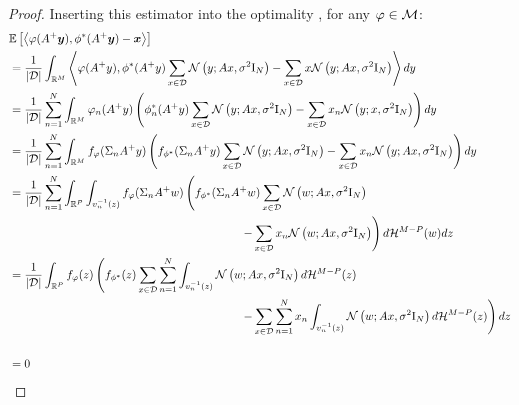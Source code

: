 \documentclass[a4paper,10pt]{article}
\begin{document}
\begin{proof}
Inserting this estimator into the optimality , for any $\varphi \in \mathcal{M}$:
\begin{align*}
    &\E{\inner{\varphi(A^+ \y), \phi^*(A^+  \y) - \x}}  \\
    &=  \frac{1}{|\D|} \int_{\R^M} \inner{\varphi(A^+  y), \phi^*(A^+  y) \sum_{x \in \D} \Normal{y; A x, \sigma^2 \Id_N} - \sum_{x \in \D} x \Normal{y; A x, \sigma^2 \Id_N}} dy \\
    &=  \frac{1}{|\D|} \sum_{n = 1}^{N} \int_{\R^M} \varphi_n (A^+  y) \left( \phi^*_n(A^+  y) \sum_{x \in \D} \Normal{y; A x, \sigma^2 \Id_N} - \sum_{x \in \D} x_n \Normal{y; x, \sigma^2 \Id_N} \right) dy \\
    &=  \frac{1}{|\D|} \sum_{n = 1}^{N} \int_{\R^M} f_{\varphi} (\Sigma_n A^+  y) \left( f_{\phi^*}(\Sigma_n A^+  y) \sum_{x \in \D} \Normal{y; A x, \sigma^2 \Id_N} - \sum_{x \in \D} x_n \Normal{y; A x, \sigma^2 \Id_N} \right) dy \\
    &=  \frac{1}{|\D|} \sum_{n = 1}^{N} \int_{\R^P} \int_{v_n^{-1}(z)} f_{\varphi} (\Sigma_n A^+ w) \left( f_{\phi^*}(\Sigma_n A^+ w) \sum_{x \in \D} \Normal{w; A x, \sigma^2 \Id_N} \right. 
    \\& \left. \hspace{7cm} -\sum_{x \in \D} x_n \Normal{w; A x, \sigma^2 \Id_N} \right) d\H^{M - P}(w) dz \\
    &=  \frac{1}{|\D|}  \int_{\R^P} f_{\varphi}(z) \left(  f_{\phi^*}(z) \sum_{x \in \D} \sum_{n = 1}^{N} \int_{v_n^{-1}(z)} \Normal{w; A x, \sigma^2 \Id_N} d\H^{M-P}(z) \right. 
    \\& \left. \hspace{7cm} - \sum_{x \in \D} \sum_{n = 1}^{N} x_n \int_{v_n^{-1}(z)} \Normal{w; A x, \sigma^2 \Id_N} d\H^{M-P}(z)\right) dz \\
    \\&= 0 
\end{align*}
\end{proof}
\end{document}

